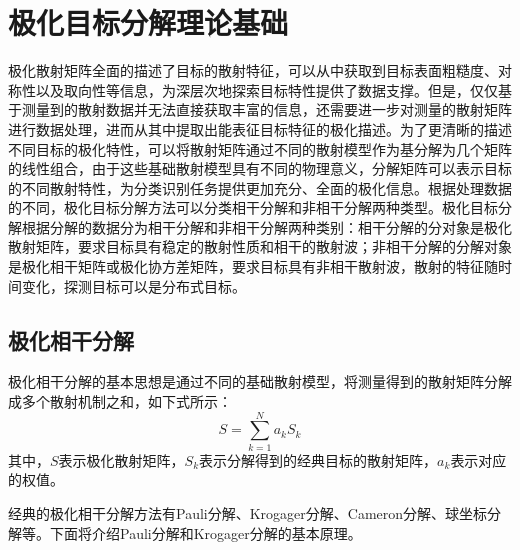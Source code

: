 \section{极化目标分解理论基础}
极化散射矩阵全面的描述了目标的散射特征，可以从中获取到目标表面粗糙度、对称性以及取向性等信息，为深层次地探索目标特性提供了数据支撑。但是，仅仅基于测量到的散射数据并无法直接获取丰富的信息，还需要进一步对测量的散射矩阵进行数据处理，进而从其中提取出能表征目标特征的极化描述。为了更清晰的描述不同目标的极化特性，可以将散射矩阵通过不同的散射模型作为基分解为几个矩阵的线性组合，由于这些基础散射模型具有不同的物理意义，分解矩阵可以表示目标的不同散射特性，为分类识别任务提供更加充分、全面的极化信息。根据处理数据的不同，极化目标分解方法可以分类相干分解和非相干分解两种类型。极化目标分解根据分解的数据分为相干分解和非相干分解两种类别：相干分解的分对象是极化散射矩阵，要求目标具有稳定的散射性质和相干的散射波；非相干分解的分解对象是极化相干矩阵或极化协方差矩阵，要求目标具有非相干散射波，散射的特征随时间变化，探测目标可以是分布式目标。
\subsection{极化相干分解}
极化相干分解的基本思想是通过不同的基础散射模型，将测量得到的散射矩阵分解成多个散射机制之和，如下式所示：
\begin{equation}
    S=\sum_{k=1}^N{a_kS_k}
\end{equation}
其中，$S$表示极化散射矩阵，$S_k$表示分解得到的经典目标的散射矩阵，$a_k$表示对应的权值。

经典的极化相干分解方法有Pauli分解、Krogager分解、Cameron分解、球坐标分解等。下面将介绍Pauli分解和Krogager分解的基本原理。
